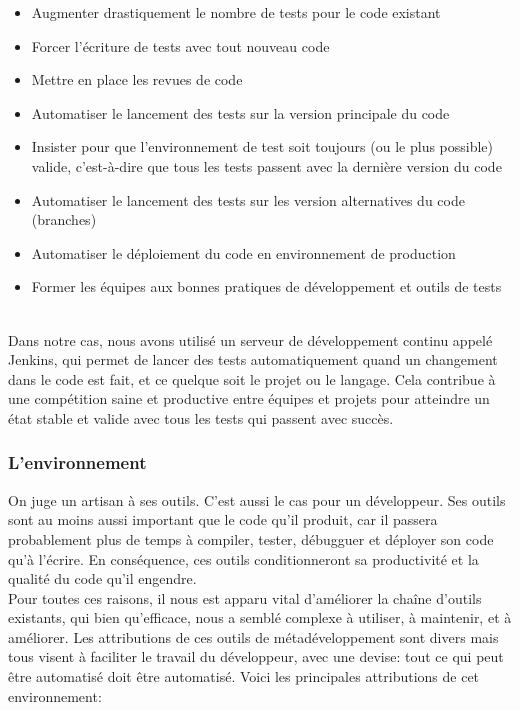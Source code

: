 \documentclass[a4paper,french,12pt]{article}
\begin{document}
	\begin{itemize}
	\item Augmenter drastiquement le nombre de tests pour le code existant
	\item Forcer l'écriture de tests avec tout nouveau code
	\item Mettre en place les revues de code
	\item Automatiser le lancement des tests sur la version principale du code
	\item Insister pour que l'environnement  de test soit toujours (ou le plus possible) valide, c'est-à-dire que tous les tests passent avec la dernière version du code
	\item Automatiser le lancement des tests sur les version alternatives du code (branches)
	\item Automatiser le déploiement du code en environnement de production
	\item Former les équipes aux bonnes pratiques de développement et outils de tests
	\end{itemize}~\\
	
	Dans notre cas, nous avons utilisé un serveur de développement continu appelé Jenkins, qui permet de lancer des tests automatiquement quand un changement dans le code est fait, et ce quelque soit le projet ou le langage. Cela contribue à une compétition saine et productive entre équipes et projets pour atteindre un état stable et valide avec tous les tests qui passent avec succès.~\\
	
	
	
	
	\subsubsection{L'environnement}
	
	On juge un artisan à ses outils. C'est aussi le cas pour un développeur. 	Ses outils sont au moins aussi important que le code qu'il produit, car il passera probablement plus de temps à compiler, tester, débugguer et déployer son code qu'à l'écrire. En conséquence, ces outils conditionneront
	sa productivité et la qualité du code qu'il engendre.~\\	
	
	Pour toutes ces raisons, il nous est apparu vital d'améliorer la chaîne d'outils existants, qui bien qu'efficace, nous a semblé complexe à utiliser, à maintenir, et à améliorer. Les attributions de ces outils de métadéveloppement sont divers mais tous visent à faciliter le travail du développeur, avec une devise: tout ce qui peut être automatisé doit être automatisé.
	Voici les principales attributions de cet environnement: ~\\
	
\end{document}
